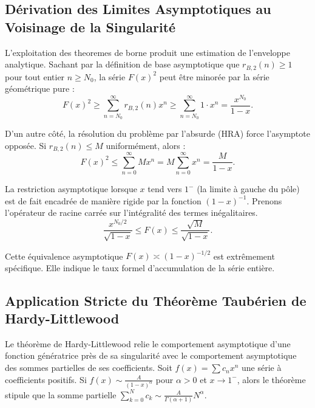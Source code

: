\documentclass[12pt,a4paper]{article}
\begin{document}
\subsection{D\'erivation des Limites Asymptotiques au Voisinage de la Singularit\'e}

L'exploitation des theoremes de borne produit une estimation de l'enveloppe analytique.
Sachant par la d\'efinition de base asymptotique que $r_{B,2}(n) \ge 1$ pour tout entier $n \ge N_0$, la s\'erie $F(x)^2$ peut \^etre minor\'ee par la s\'erie g\'eom\'etrique pure :
\begin{equation}
F(x)^2 \ge \sum_{n=N_0}^{\infty} r_{B,2}(n) x^n \ge \sum_{n=N_0}^{\infty} 1 \cdot x^n = \frac{x^{N_0}}{1-x}.
\end{equation}

D'un autre c\^ot\'e, la r\'esolution du probl\`eme par l'absurde (HRA) force l'asymptote oppos\'ee. Si $r_{B,2}(n) \le M$ uniform\'ement, alors :
\begin{equation}
F(x)^2 \le \sum_{n=0}^{\infty} M x^n = M \sum_{n=0}^{\infty} x^n = \frac{M}{1-x}.
\end{equation}

La restriction asymptotique lorsque $x$ tend vers $1^-$ (la limite \`a gauche du p\^ole) est de fait encadr\'ee de mani\`ere rigide par la fonction $(1-x)^{-1}$.
Prenons l'op\'erateur de racine carr\'ee sur l'int\'egralit\'e des termes in\'egalitaires.
\begin{equation}
\frac{x^{N_0/2}}{\sqrt{1-x}} \le F(x) \le \frac{\sqrt{M}}{\sqrt{1-x}}.
\end{equation}

Cette \'equivalence asymptotique $F(x) \asymp (1-x)^{-1/2}$ est extr\^emement sp\'ecifique. Elle indique le taux formel d'accumulation de la s\'erie enti\`ere.

\subsection{Application Stricte du Th\'eor\`eme Taub\'erien de Hardy-Littlewood}

Le th\'eor\`eme de Hardy-Littlewood relie le comportement asymptotique d'une fonction g\'en\'eratrice pr\`es de sa singularit\'e avec le comportement asymptotique des sommes partielles de ses coefficients.
Soit $f(x) = \sum c_n x^n$ une s\'erie \`a coefficients positifs. Si $f(x) \sim \frac{A}{(1-x)^{\alpha}}$ pour $\alpha > 0$ et $x \to 1^-$, alors le th\'eor\`eme stipule que la somme partielle $\sum_{k=0}^N c_k \sim \frac{A}{\Gamma(\alpha+1)} N^{\alpha}$.
\end{document}
